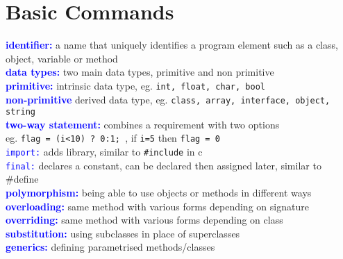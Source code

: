 \documentclass[a4paper,10pt]{article}
\begin{document}
\section{Basic Commands}
\textcolor{blue}{\textbf{identifier:}} a name that uniquely identifies a program element such as a class, object, variable or method\\
\textcolor{blue}{\textbf{data types:}} two main data types, primitive and non primitive \\
\textcolor{blue}{\textbf{primitive:}} intrinsic data type, eg. \texttt{int, float, char, bool} \\
\textcolor{blue}{\textbf{non-primitive}} derived data type, eg. \texttt{class, array, interface, object, string}\\
\textcolor{blue}{\textbf{two-way statement:}}  combines a requirement with two options \\
\indent eg. \texttt{flag = (i<10) ? 0:1; },  if \texttt{i=5} then \texttt{flag = 0}\\
\textcolor{blue}{\texttt{import:}} adds library, similar to \texttt{\#include} in c \\
\textcolor{blue}{\texttt{final:}} declares a constant, can be declared then assigned later, similar to \#define \\
\textcolor{blue}{\textbf{polymorphism:}} being able to use objects or methods in different ways \\ 
\textcolor{blue}{\textbf{overloading:}} same method with various forms depending on signature \\ 
\textcolor{blue}{\textbf{overriding:}} same method with various forms depending on class \\ 
\textcolor{blue}{\textbf{substitution:}} using subclasses in place of superclasses \\ 
\textcolor{blue}{\textbf{generics:}} defining parametrised methods/classes \\ 
\end{document}
